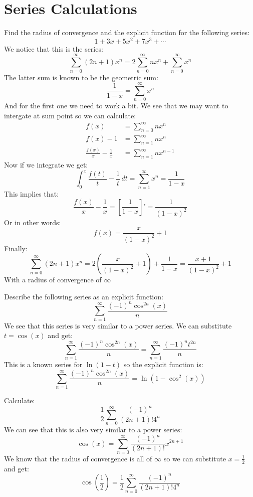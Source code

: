 \documentclass[11pt,a4paper]{article}
\begin{document}
	\newpage
	
	\section{Series Calculations}
	Find the radius of convergence and the explicit function for the 
	following series:
	\[
		1 + 3x + 5x^2 + 7x^3 + \cdots
	\]
	We notice that this is the series:
	\[
		\sum_{n=0}^{\infty}{(2n+1)x^n} = 
		2\sum_{n=0}^{\infty}{nx^n} + 
		\sum_{n=0}^{\infty}{x^n}
	\]
	The latter sum is known to be the geometric sum:
	\[
		\frac{1}{1-x} = \sum_{n=0}^{\infty}{x^n}
	\]
	And for the first one we need to work a bit. We see that we may want
	to intergate at sum point so we can calculate:
	\begin{align*}
		f(x) &= \sum_{n=0}^{\infty}{nx^n} \\
		f(x) - 1 &= \sum_{n=1}^{\infty}{nx^n} \\
		\frac{f(x)}{x} - \frac{1}{x} &= \sum_{n=1}^{\infty}{nx^{n-1}}
	\end{align*}
	Now if we integrate we get:
	\[
		\int_{0}^{x}{\frac{f(t)}{t} - \frac{1}{t}\,dt} = 
		\sum_{n=1}^{\infty}{x^{n}} =
		\frac{1}{1-x}
	\]
	This implies that:
	\[
		\frac{f(x)}{x} - \frac{1}{x} = \left[\frac{1}{1-x}\right]' = 
		\dfrac{1}{\left(1-x\right)^2}
	\]
	Or in other words:
	\[
		f(x) = \dfrac{x}{\left(1-x\right)^2} + 1
	\]
	Finally:
	\[
		\sum_{n=0}^{\infty}{(2n+1)x^n} = 
		2\left(\dfrac{x}{\left(1-x\right)^2} + 1\right) + \frac{1}{1-x} = 
		\frac{x+1}{(1-x)^2} + 1
	\]
	With a radius of convergence of $\infty$
	
	\newpage
	
	Describe the following series as an explicit function:
	\[
		\sum_{n=1}^{\infty}{\frac{(-1)^n\cos^{2n}(x)}{n}}
	\]
	We see that this series is very similar to a power series. We can
	substitute $t = \cos(x)$ and get:
	\[
		\sum_{n=1}^{\infty}{\frac{(-1)^n\cos^{2n}(x)}{n}} = 
		\sum_{n=1}^{\infty}{\frac{(-1)^n t^{2n}}{n}}
	\]
	This is a known series for $\ln(1-t)$ so the explicit function is:
	\[
		\sum_{n=1}^{\infty}{\frac{(-1)^n\cos^{2n}(x)}{n}} = 
		\ln(1-\cos^2(x))
	\]
	
	\newpage
	Calculate: 
	\[
		\frac{1}{2}\sum_{n=0}^{\infty}{\frac{(-1)^n}{(2n+1)! 4^n}}
	\]
	We can see that this is also very similar to a power series:
	\[
		\cos(x) = \sum_{n=0}^{\infty}{\frac{(-1)^n}{(2n+1)!}x^{2n+1}}
	\]
	We know that the radius of convergence is all of $\infty$ so we
	can substitute $x = \frac 12$ and get:
	\[
		\cos\left(\frac 12\right) = 
		\frac{1}{2}\sum_{n=0}^{\infty}{\frac{(-1)^n}{(2n+1)! 4^n}}
	\]
	
\end{document}
